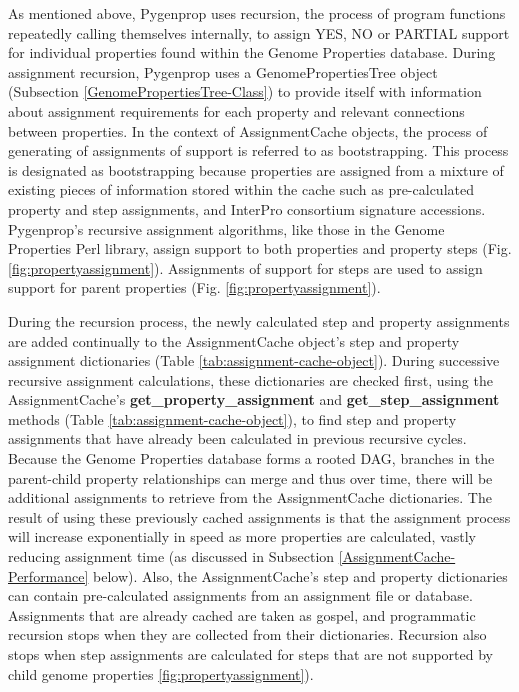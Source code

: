 As mentioned above, Pygenprop uses recursion, the process of program functions repeatedly calling themselves internally, to assign YES, NO or PARTIAL support for individual properties found within the Genome Properties database. During assignment recursion, Pygenprop uses a GenomePropertiesTree object (Subsection \ref{GenomePropertiesTree-Class}) to provide itself with information about assignment requirements for each property and relevant connections between properties. In the context of AssignmentCache objects, the process of generating of assignments of support is referred to as bootstrapping. This process is designated as bootstrapping because properties are assigned from a mixture of existing pieces of information stored within the cache such as pre-calculated property and step assignments, and InterPro consortium signature accessions. Pygenprop's recursive assignment algorithms, like those in the Genome Properties Perl library, assign support to both properties and property steps (Fig. \ref{fig:propertyassignment}). Assignments of support for steps are used to assign support for parent properties (Fig. \ref{fig:propertyassignment}).

During the recursion process, the newly calculated step and property assignments are added continually to the AssignmentCache object's step and property assignment dictionaries (Table \ref{tab:assignment-cache-object}). During successive recursive assignment calculations, these dictionaries are checked first, using the AssignmentCache's \textbf{get\_property\_assignment} and \textbf{get\_step\_assignment} methods (Table \ref{tab:assignment-cache-object}), to find step and property assignments that have already been calculated in previous recursive cycles. Because the Genome Properties database forms a rooted DAG, branches in the parent-child property relationships can merge and thus over time, there will be additional assignments to retrieve from the AssignmentCache dictionaries. The result of using these previously cached assignments is that the assignment process will increase exponentially in speed as more properties are calculated, vastly reducing assignment time (as discussed in Subsection \ref{AssignmentCache-Performance} below). Also, the AssignmentCache's step and property dictionaries can contain pre-calculated assignments from an assignment file or database. Assignments that are already cached are taken as gospel, and programmatic recursion stops when they are collected from their dictionaries. Recursion also stops when step assignments are calculated for steps that are not supported by child genome properties \ref{fig:propertyassignment}).

